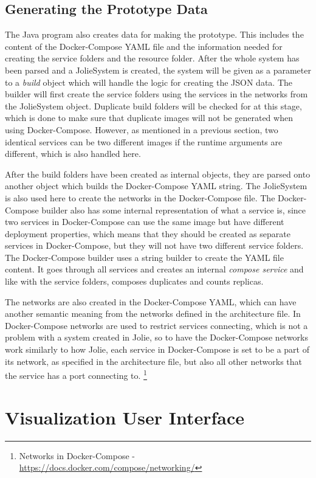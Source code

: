 \subsection{Generating the Prototype Data}
The Java program also creates data for making the prototype. This includes the content of the Docker-Compose YAML file and the information needed for creating the service folders and the resource folder.
After the whole system has been parsed and a JolieSystem is created, the system will be given as a parameter to a \textit{build} object which will handle the logic for creating the JSON data.
The builder will first create the service folders using the services in the networks from the JolieSystem object. Duplicate build folders will be checked for at this stage, which is done to make sure that duplicate images will not be generated when using Docker-Compose.
However, as mentioned in a previous section, two identical services can be two different images if the runtime arguments are different, which is also handled here.

After the build folders have been created as internal objects, they are parsed onto another object which builds the Docker-Compose YAML string. The JolieSystem is also used here to create the networks in the Docker-Compose file.
The Docker-Compose builder also has some internal representation of what a service is, since two services in Docker-Compose can use the same image but have different deployment properties, which means that they should be created as separate services in Docker-Compose, but they will not have two different service folders.
The Docker-Compose builder uses a string builder to create the YAML file content. It goes through all services and creates an internal \textit{compose service} and like with the service folders, composes duplicates and counts replicas.

The networks are also created in the Docker-Compose YAML, which can have another semantic meaning from the networks defined in the architecture file.
In Docker-Compose networks are used to restrict services connecting, which is not a problem with a system created in Jolie, so to have the Docker-Compose networks work similarly to how Jolie, each service in Docker-Compose is set to be a part of
its network, as specified in the architecture file, but also all other networks that the service has a port connecting to. \footnote{Networks in Docker-Compose - \url{https://docs.docker.com/compose/networking/}}

\section{Visualization User Interface}
